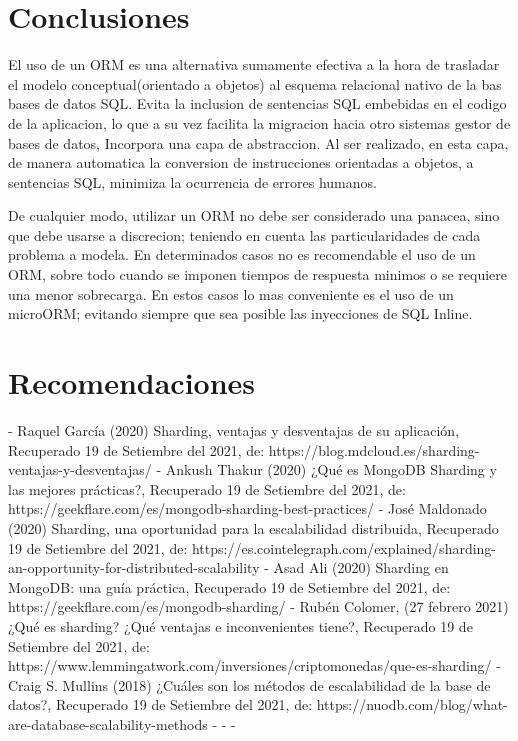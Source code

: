 \documentclass[twoside,twocolumn]{article}
\begin{document}
\section{Conclusiones}
El uso de un ORM es una alternativa sumamente efectiva a la hora de trasladar el modelo conceptual(orientado a objetos)
al esquema relacional nativo de la bas bases de datos SQL. Evita la inclusion de sentencias SQL embebidas en el codigo de la aplicacion, lo que a su vez facilita la migracion
hacia otro sistemas gestor de bases de datos, Incorpora una capa de abstraccion. Al ser realizado, en esta capa, de manera automatica la conversion de 
instrucciones orientadas a objetos, a sentencias SQL, minimiza la ocurrencia de errores humanos.

De cualquier modo, utilizar un ORM no debe ser considerado una panacea, sino que debe usarse a discrecion; teniendo en cuenta las 
particularidades de cada problema a modela. En determinados casos no es recomendable el uso de un ORM,
sobre todo cuando se imponen tiempos de respuesta minimos o se requiere una menor sobrecarga. En estos casos lo mas conveniente es el uso de un 
microORM; evitando siempre que sea posible las inyecciones de SQL Inline.
\section{Recomendaciones}

\begin{thebibliography}{XXX0000}
	\bibitem - Raquel García (2020) Sharding, ventajas y desventajas de su aplicación, Recuperado 19 de Setiembre del 2021, de: https://blog.mdcloud.es/sharding-ventajas-y-desventajas/ 
	\bibitem - Ankush Thakur (2020) ¿Qué es MongoDB Sharding y las mejores prácticas?, Recuperado 19 de Setiembre del 2021, de: https://geekflare.com/es/mongodb-sharding-best-practices/
	\bibitem - José Maldonado (2020) Sharding, una oportunidad para la escalabilidad distribuida, Recuperado 19 de Setiembre del 2021, de: https://es.cointelegraph.com/explained/sharding-an-opportunity-for-distributed-scalability 
	\bibitem - Asad Ali (2020) Sharding en MongoDB: una guía práctica, Recuperado 19 de Setiembre del 2021, de: https://geekflare.com/es/mongodb-sharding/
	\bibitem - Rubén Colomer, (27 febrero 2021) ¿Qué es sharding? ¿Qué ventajas e inconvenientes tiene?, Recuperado 19 de Setiembre del 2021, de: https://www.lemmingatwork.com/inversiones/criptomonedas/que-es-sharding/  
	\bibitem - Craig S. Mullins (2018) ¿Cuáles son los métodos de escalabilidad de la base de datos?, Recuperado 19 de Setiembre del 2021, de: https://nuodb.com/blog/what-are-database-scalability-methods 
	\bibitem - 
	\bibitem - 
	\bibitem - 
	\end{thebibliography}

\end{document}
